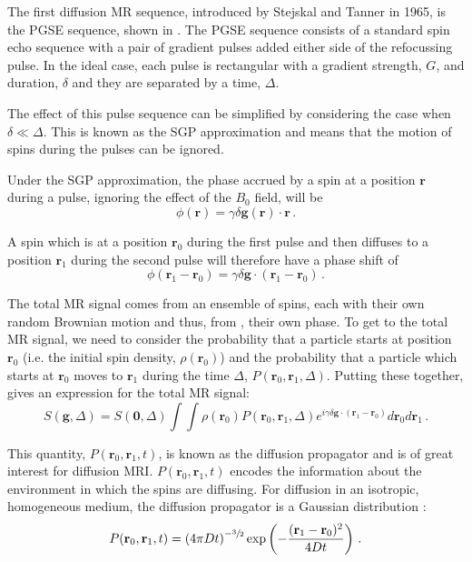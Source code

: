 The first diffusion MR sequence, introduced by Stejskal and Tanner in 1965\cite{Stejskal1965}, is the \ac{PGSE} sequence, shown in .
The PGSE sequence consists of a standard spin echo sequence with a pair of gradient pulses added either side of the refocussing pulse.
In the ideal case, each pulse is rectangular with a gradient strength, $G$, and duration, $\delta$ and they are separated by a time, $\Delta$.  

The effect of this pulse sequence can be simplified by considering the case when $\delta \ll \Delta$. This is known as the \ac{SGP} approximation and means that the motion of spins during the pulses can be ignored. 

Under the \ac{SGP} approximation, the phase accrued by a spin at a position $\mathbf{r}$ during a pulse, ignoring the effect of the $B_0$ field,  will be
\begin{equation}
  \phi(\mathbf{r}) = \gamma \delta \mathbf{g(r)}\cdot\mathbf{r}\,.
  \label{eq:phi_single_SGP}
\end{equation}

A spin which is at a position $\mathbf{r}_0$ during the first pulse and then diffuses to a position $\mathbf{r}_1$ during the second pulse will therefore have a phase shift of
\begin{equation}
  \phi(\mathbf{r}_1 - \mathbf{r}_0) = \gamma\delta\mathbf{g} \cdot \left(\mathbf{r}_1 - \mathbf{r}_0\right)\,.
  \label{eq:delta_phi}
\end{equation}

The total MR signal comes from an ensemble of spins, each with their own random Brownian motion and thus, from , their own phase.
To get to the total MR signal, we need to consider the probability that a particle starts at position $\mathbf{r}_0$ (i.e. the initial spin density, $\rho(\mathbf{r}_0)$) and the probability that a particle which starts at $\mathbf{r}_0$ moves to $\mathbf{r}_1$ during the time $\Delta$, $P(\mathbf{r}_0, \mathbf{r}_1, \Delta)$.
Putting these together, gives an expression for the total MR signal\cite{Price1997,Stejskal1965}:
\begin{equation}
  S(\mathbf{g}, \Delta) = S(\mathbf{0}, \Delta)\int\int \rho(\mathbf{r}_0)P(\mathbf{r}_0, \mathbf{r}_1, \Delta) e^{i\gamma\delta\mathbf{g} \cdot (\mathbf{r}_1 - \mathbf{r}_0)}  d\mathbf{r}_0d\mathbf{r}_1\,.
  \label{eq:total_signal_sgp}
\end{equation}

This quantity, $P(\mathbf{r}_0, \mathbf{r}_1, t)$, is known as the diffusion propagator and is of great interest for diffusion MRI.
$P(\mathbf{r}_0, \mathbf{r}_1, t)$ encodes the information about the environment in which the spins are diffusing. 
For diffusion in an isotropic, homogeneous medium, the diffusion propagator is a Gaussian distribution \cite{Price1997}:
\begin{equation}
  P(\mathbf{r}_0, \mathbf{r}_1, t) = \left(4\pi Dt\right)^{-\sfrac{3}{2}}\exp\left(-\frac{(\mathbf{r}_1 - \mathbf{r}_0)^2}{4Dt}\right)\,.
  \label{eq:propagator_diffusion}
\end{equation}

